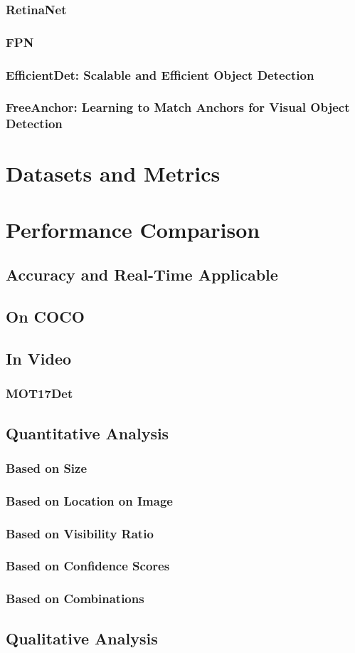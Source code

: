 \documentclass[12pt, letterpaper, twoside]{article}
\begin{document}
\subsubsection{RetinaNet}
\subsubsection{FPN}
\subsubsection{EfficientDet: Scalable and Efficient Object Detection}
\subsubsection{FreeAnchor: Learning to Match Anchors for Visual Object Detection}

\section{Datasets and Metrics}
\section{Performance Comparison}
\subsection{Accuracy and Real-Time Applicable}
\subsection{On COCO}

\subsection{In Video}
\subsubsection{MOT17Det}

\subsection{Quantitative Analysis}
\subsubsection{Based on Size}
\subsubsection{Based on Location on Image}
\subsubsection{Based on Visibility Ratio}
\subsubsection{Based on Confidence Scores}
\subsubsection{Based on Combinations}

\subsection{Qualitative Analysis}
\end{document}
